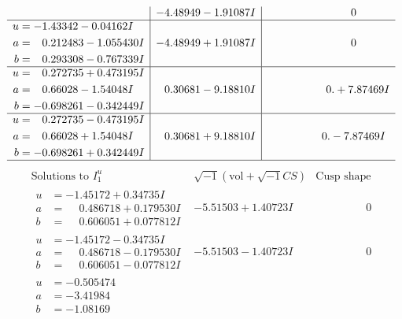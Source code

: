 \documentclass[1p]{elsarticle_modified}
\theoremstyle{definition}
\newcommand{\I}{\sqrt{-1}}
\begin{document}
$$\begin{array}{c|c|c}
 & -4.48949 - 1.91087 I & \phantom{-0.000000 } 0 \\ \hline\begin{aligned}
u &= -1.43342 - 0.04162 I \\
a &= \phantom{-}0.212483 - 1.055430 I \\
b &= \phantom{-}0.293308 - 0.767339 I\end{aligned}
 & -4.48949 + 1.91087 I & \phantom{-0.000000 } 0 \\ \hline\begin{aligned}
u &= \phantom{-}0.272735 + 0.473195 I \\
a &= \phantom{-}0.66028 - 1.54048 I \\
b &= -0.698261 - 0.342449 I\end{aligned}
 & \phantom{-}0.30681 - 9.18810 I & \phantom{-0.000000 -}0. + 7.87469 I \\ \hline\begin{aligned}
u &= \phantom{-}0.272735 - 0.473195 I \\
a &= \phantom{-}0.66028 + 1.54048 I \\
b &= -0.698261 + 0.342449 I\end{aligned}
 & \phantom{-}0.30681 + 9.18810 I & \phantom{-0.000000 } 0. - 7.87469 I\\
 \hline 
 \end{array}$$\newpage$$\begin{array}{c|c|c}  
\text{Solutions to }I^u_{1}& \I (\text{vol} + \sqrt{-1}CS) & \text{Cusp shape}\\
 \hline 
\begin{aligned}
u &= -1.45172 + 0.34735 I \\
a &= \phantom{-}0.486718 + 0.179530 I \\
b &= \phantom{-}0.606051 + 0.077812 I\end{aligned}
 & -5.51503 + 1.40723 I & \phantom{-0.000000 } 0 \\ \hline\begin{aligned}
u &= -1.45172 - 0.34735 I \\
a &= \phantom{-}0.486718 - 0.179530 I \\
b &= \phantom{-}0.606051 - 0.077812 I\end{aligned}
 & -5.51503 - 1.40723 I & \phantom{-0.000000 } 0 \\ \hline\begin{aligned}
u &= -0.505474\phantom{ +0.000000I} \\
a &= -3.41984\phantom{ +0.000000I} \\
b &= -1.08169\phantom{ +0.000000I}\end{aligned}

\end{array}$$
\end{document}

